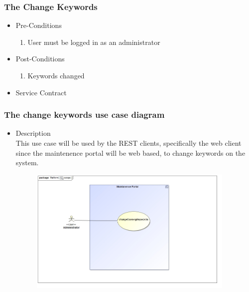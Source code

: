 \documentclass[english]{article}
\begin{document}
				
		
		\subsubsection{The Change Keywords}
		
			\begin{itemize}
	
		
		\item Pre-Conditions
			\begin{enumerate}
				\item User must be logged in as an administrator
			\end{enumerate}
		\item Post-Conditions
			\begin{enumerate}
			\item Keywords changed
						
			\end{enumerate}
		\item Service Contract
			\begin{figure}
			
			\end{figure}

		\end{itemize}
		
		
		\subsubsection* {The change keywords use case diagram}
		\begin{itemize}
			\item Description\\
			This use case will be used by the REST clients, specifically the web client since the maintenence 					portal will be web based, to change keywords on the system.
		\end{itemize}
		\includegraphics[width=14cm,height=6cm,keepaspectratio]{keyWords.jpg}		
		
\end{document}
